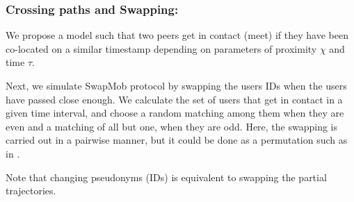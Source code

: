 \documentclass[review]{elsarticle}
\begin{document}
\subsubsection{Crossing paths and Swapping:} \label{sec:cross}
We propose a model such that two peers get in contact (meet) if they have been co-located on a similar timestamp depending on parameters of proximity $\chi$ and time $\tau$.


Next, we simulate SwapMob protocol by swapping the users IDs when the users have passed close enough.
We calculate the set of users that get in contact in a given time interval, and choose a random matching among them when they are even and a matching of all but one, when they are odd.
Here, the swapping is carried out in a pairwise manner, but it could be done as a permutation such as in \cite{Beresford04mixzones}.

Note that changing pseudonyms (IDs) is equivalent to swapping the partial trajectories.


\begin{figure}[!t]
\end{figure}
\end{document}
